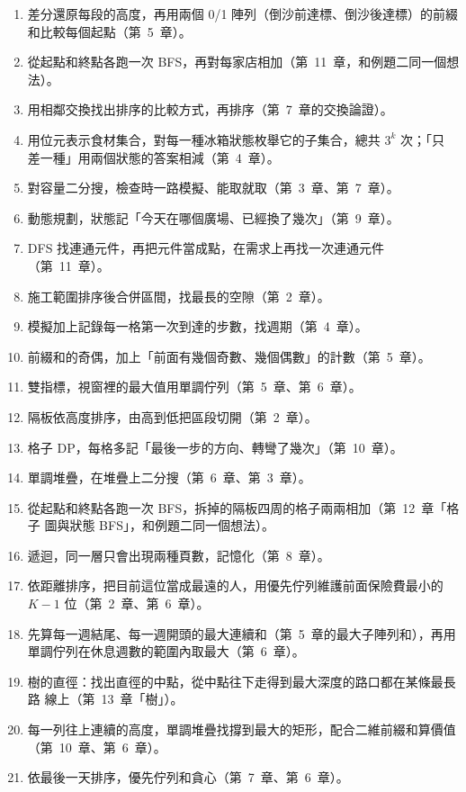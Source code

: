 \begin{enumerate}
\item 差分還原每段的高度，再用兩個 0/1 陣列（倒沙前達標、倒沙後達標）的前綴
和比較每個起點（第~5~章）。
\item 從起點和終點各跑一次 BFS，再對每家店相加（第~11~章，和例題二同一個想
法）。
\item 用相鄰交換找出排序的比較方式，再排序（第~7~章的交換論證）。
\item 用位元表示食材集合，對每一種冰箱狀態枚舉它的子集合，總共 $3^k$ 次；「只
差一種」用兩個狀態的答案相減（第~4~章）。
\item 對容量二分搜，檢查時一路模擬、能取就取（第~3~章、第~7~章）。
\item 動態規劃，狀態記「今天在哪個廣場、已經換了幾次」（第~9~章）。
\item DFS 找連通元件，再把元件當成點，在需求上再找一次連通元件（第~11~章）。
\item 施工範圍排序後合併區間，找最長的空隙（第~2~章）。
\item 模擬加上記錄每一格第一次到達的步數，找週期（第~4~章）。
\item 前綴和的奇偶，加上「前面有幾個奇數、幾個偶數」的計數（第~5~章）。
\item 雙指標，視窗裡的最大值用單調佇列（第~5~章、第~6~章）。
\item 隔板依高度排序，由高到低把區段切開（第~2~章）。
\item 格子 DP，每格多記「最後一步的方向、轉彎了幾次」（第~10~章）。
\item 單調堆疊，在堆疊上二分搜（第~6~章、第~3~章）。
\item 從起點和終點各跑一次 BFS，拆掉的隔板四周的格子兩兩相加（第~12~章「格子
圖與狀態 BFS」，和例題二同一個想法）。
\item 遞迴，同一層只會出現兩種頁數，記憶化（第~8~章）。
\item 依距離排序，把目前這位當成最遠的人，用優先佇列維護前面保險費最小的
$K - 1$ 位（第~2~章、第~6~章）。
\item 先算每一週結尾、每一週開頭的最大連續和（第~5~章的最大子陣列和），再用
單調佇列在休息週數的範圍內取最大（第~6~章）。
\item 樹的直徑：找出直徑的中點，從中點往下走得到最大深度的路口都在某條最長路
線上（第~13~章「樹」）。
\item 每一列往上連續的高度，單調堆疊找撐到最大的矩形，配合二維前綴和算價值
（第~10~章、第~6~章）。
\item 依最後一天排序，優先佇列和貪心（第~7~章、第~6~章）。
\end{enumerate}
